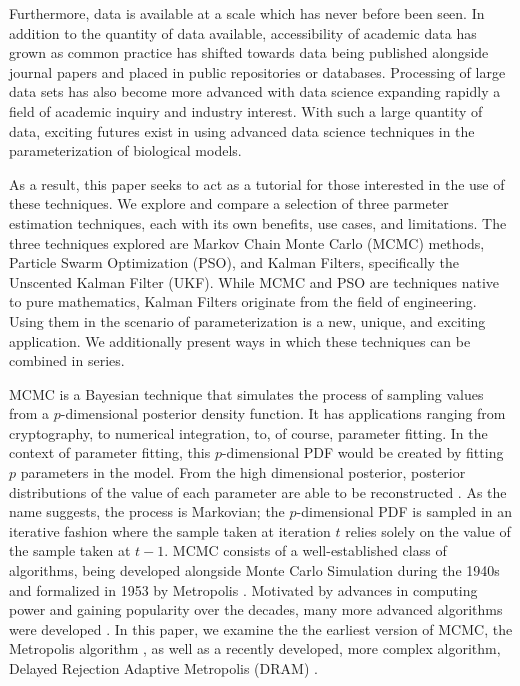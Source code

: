 \par Furthermore, data is available at a scale which has never before been seen. In addition to the quantity of data available, accessibility of academic data has grown as common practice has shifted towards data being published alongside journal papers and placed in public repositories or databases. Processing of large data sets has also become more advanced with data science expanding rapidly a field of academic inquiry and industry interest. With such a large quantity of data, exciting futures exist in using advanced data science techniques in the parameterization of biological models. 
\par As a result, this paper seeks to act as a tutorial for those interested in the use of these techniques. We explore and compare a selection of three parmeter estimation techniques, each with its own benefits, use cases, and limitations. The three techniques explored are Markov Chain Monte Carlo (MCMC) methods, Particle Swarm Optimization (PSO), and Kalman Filters, specifically the Unscented Kalman Filter (UKF). While MCMC and PSO are techniques native to pure mathematics, Kalman Filters originate from the field of engineering. Using them in the scenario of parameterization is a new, unique, and exciting application. We additionally present ways in which these techniques can be combined in series.
\par MCMC is a Bayesian technique that simulates the process of sampling values from a $p$-dimensional posterior density function. It has applications ranging from cryptography, to numerical integration, to, of course, parameter fitting. In the context of parameter fitting, this $p$-dimensional PDF would be created by fitting $p$ parameters in the model. From the high dimensional posterior, posterior distributions of the value of each parameter are able to be reconstructed \cite{MCMCintro}. As the name suggests, the process is Markovian; the $p$-dimensional PDF is sampled in an iterative fashion where the sample taken at iteration $t$ relies solely on the value of the sample taken at $t-1$. MCMC consists of a well-established class of algorithms, being developed alongside Monte Carlo Simulation during the 1940s and formalized in 1953 by Metropolis \cite{metropolis1953}. Motivated by advances in computing power and gaining popularity over the decades, many more advanced algorithms were developed \cite{MCMChistory}. In this paper, we examine the the earliest version of MCMC, the Metropolis algorithm \cite{metropolis1953}, as well as a recently developed, more complex algorithm, Delayed Rejection Adaptive Metropolis (DRAM) \cite{DRAM1}.
